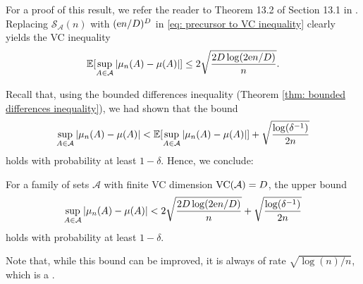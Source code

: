 For a proof of this result, we refer the reader to Theorem 13.2 of Section 13.1 in \cite[p.~216]{devroye1996probabilistic}. Replacing $\mathcal{S}_{\mathcal{A}}(n)$ with $(\mathrm{e} n/D)^D$ in \eqref{eq: precursor to VC inequality} clearly yields the VC inequality
\[
    \operatorname{\mathbb{E}}[\sup_{A \in \mathcal{A}} \abs{\mu_n(A) - \mu(A)}] \leq 2 \sqrt{\frac{2D \log(2 \mathrm{e} n / D)}{n}}.
\]

Recall that, using the bounded differences inequality (Theorem \ref{thm: bounded differences inequality}), we had shown that the bound
\[
    \sup_{A \in \mathcal{A}} \abs{\mu_n(A) - \mu(A)} < \operatorname{\mathbb{E}}[\sup_{A \in \mathcal{A}} \abs{\mu_n(A) - \mu(A)}] + \sqrt{\frac{\log(\delta^{-1})}{2n}}
\]
holds with probability at least $1 - \delta$. Hence, we conclude:

\begin{corollary}[VC Inequality]
For a family of sets $\mathcal{A}$ with finite VC dimension $\operatorname{VC}(\mathcal{A}) = D$, the upper bound
\[
    \sup_{A \in \mathcal{A}} \abs{\mu_n(A) - \mu(A)} < 2 \sqrt{\frac{2D \log(2 \mathrm{e} n / D)}{n}} + \sqrt{\frac{\log(\delta^{-1})}{2n}}
\]
holds with probability at least $1 - \delta$.
\end{corollary}

Note that, while this bound can be improved, it is always of rate $\sqrt{\log(n) / n}$, which is a .
